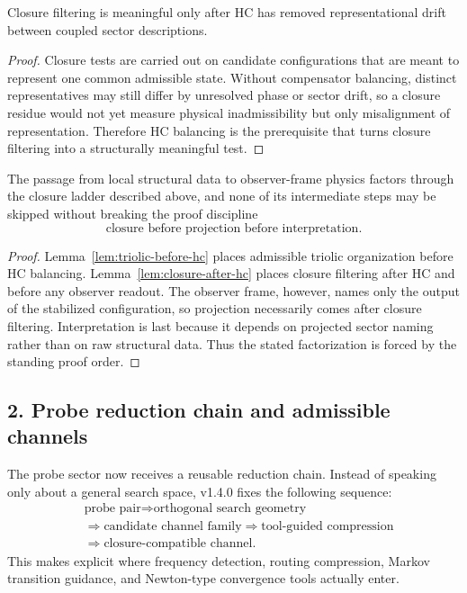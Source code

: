 \begin{lemma}
\label{lem:closure-after-hc}
Closure filtering is meaningful only after HC has removed representational drift
between coupled sector descriptions.
\end{lemma}

\begin{proof}
Closure tests are carried out on candidate configurations that are meant to
represent one common admissible state. Without compensator balancing, distinct
representatives may still differ by unresolved phase or sector drift, so a
closure residue would not yet measure physical inadmissibility but only
misalignment of representation. Therefore HC balancing is the prerequisite that
turns closure filtering into a structurally meaningful test.
\end{proof}

\begin{proposition}
\label{prop:closure-ladder}
The passage from local structural data to observer-frame physics factors through
the closure ladder described above, and none of its intermediate steps may be
skipped without breaking the proof discipline
\[
\text{closure before projection before interpretation}.
\]
\end{proposition}

\begin{proof}
Lemma~\ref{lem:triolic-before-hc} places admissible triolic organization before
HC balancing. Lemma~\ref{lem:closure-after-hc} places closure filtering after
HC and before any observer readout. The observer frame, however, names only the
output of the stabilized configuration, so projection necessarily comes after
closure filtering. Interpretation is last because it depends on projected
sector naming rather than on raw structural data. Thus the stated factorization
is forced by the standing proof order.
\end{proof}

\subsection*{2. Probe reduction chain and admissible channels}
The probe sector now receives a reusable reduction chain. Instead of speaking
only about a general search space, v1.4.0 fixes the following sequence:
\[
\begin{aligned}
&\text{probe pair}
\Longrightarrow \text{orthogonal search geometry}\\[0.15em]
&\Longrightarrow \text{candidate channel family}
\Longrightarrow \text{tool-guided compression}\\[0.15em]
&\Longrightarrow \text{closure-compatible channel}.
\end{aligned}
\]
This makes explicit where frequency detection, routing compression, Markov
transition guidance, and Newton-type convergence tools actually enter.

